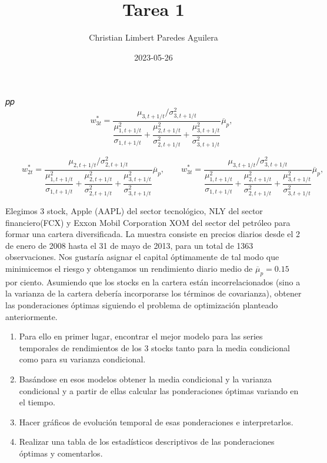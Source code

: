\documentclass[
]{article}
\title{Tarea 1}
\author{Christian Limbert Paredes Aguilera}
\date{2023-05-26}
\begin{document}
\maketitle

𝑝𝑝
\[\qquad w_{3t}^* = \dfrac{\mu_{3,t+1/t}/\sigma_{3,t+1/t}^2}{\dfrac{\mu_{1,t+1/t}^2}{\sigma_{1,t+1/t}}+\dfrac{\mu_{2,t+1/t}^2}{\sigma^2_{2,t+1/t}}+\dfrac{\mu_{3,t+1/t}^2}{\sigma^2_{3,t+1/t}}}\overline{\mu}_p,\]

\[\qquad w_{2t}^* = \dfrac{\mu_{2,t+1/t}/\sigma_{2,t+1/t}^2}{\dfrac{\mu_{1,t+1/t}^2}{\sigma_{1,t+1/t}}+\dfrac{\mu_{2,t+1/t}^2}{\sigma^2_{2,t+1/t}}+\dfrac{\mu_{3,t+1/t}^2}{\sigma^2_{3,t+1/t}}}\overline{\mu}_p,\qquad w_{3t}^* = \dfrac{\mu_{3,t+1/t}/\sigma_{3,t+1/t}^2}{\dfrac{\mu_{1,t+1/t}^2}{\sigma_{1,t+1/t}}+\dfrac{\mu_{2,t+1/t}^2}{\sigma^2_{2,t+1/t}}+\dfrac{\mu_{3,t+1/t}^2}{\sigma^2_{3,t+1/t}}}\overline{\mu}_p,\]

Elegimos 3 stock, Apple (AAPL) del sector tecnológico, NLY del sector
financiero(FCX) y Exxon Mobil Corporation XOM del sector del petróleo
para formar una cartera diversificada. La muestra consiste en precios
diarios desde el 2 de enero de 2008 hasta el 31 de mayo de 2013, para un
total de 1363 observaciones. Nos gustaría asignar el capital óptimamente
de tal modo que minimicemos el riesgo y obtengamos un rendimiento diario
medio de \(\overline{\mu}_p=0.15\) por ciento. Asumiendo que los stocks
en la cartera están incorrelacionados (sino a la varianza de la cartera
debería incorporarse los términos de covarianza), obtener las
ponderaciones óptimas siguiendo el problema de optimización planteado
anteriormente.

\begin{enumerate}
\def\labelenumi{\arabic{enumi}.}
\item
  Para ello en primer lugar, encontrar el mejor modelo para las series
  temporales de rendimientos de los 3 stocks tanto para la media
  condicional como para su varianza condicional.
\item
  Basándose en esos modelos obtener la media condicional y la varianza
  condicional y a partir de ellas calcular las ponderaciones óptimas
  variando en el tiempo.
\item
  Hacer gráficos de evolución temporal de esas ponderaciones e
  interpretarlos.
\item
  Realizar una tabla de los estadísticos descriptivos de las
  ponderaciones óptimas y comentarlos.
\end{enumerate}
\end{document}
